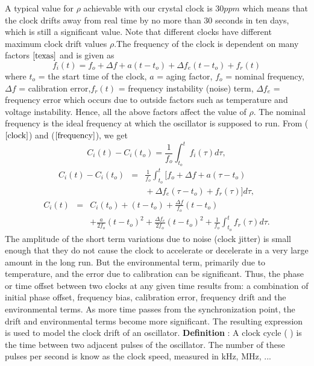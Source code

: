 \documentclass[a4paper,10pt]{report}
\begin{document}
\newline
A typical value for $\rho$ achievable with our crystal clock is $30ppm$ which means that the clock drifts away from real time by no more than 30 seconds in ten days, which is still a significant value. Note that different clocks have different maximum clock drift values
$\rho$.\newline The frequency of the clock is dependent on many factors $\cite{texas}$ and is given as
\begin{equation}
f_i(t) = f_o + \Delta f + a(t-t_o) + \Delta f_e(t-t_o) + f_r(t)
\label{frequency}
\end{equation}
where \newline $t_o$ = the start time of the clock, \newline $a$ = aging factor,  \newline $f_o$ = nominal frequency, \newline $\Delta
f$ = calibration error,\newline $f_r(t)$ = frequency instability (noise) term, \newline $\Delta f_e$ = frequency error which occurs
due to outside factors such as temperature and voltage instability. \newline Hence, all the above factors affect the value of $\rho$.
The nominal frequency is the ideal frequency at which the oscillator is supposed to run. From ($\ref{clock}$) and ($\ref{frequency}$), we get
\begin{equation}
C_i(t) - C_i(t_o) = \frac{1}{f_o} \int^{t}_{t_o}f_i(\tau)d\tau ,
\end{equation}
\begin{eqnarray*}
C_i(t) - C_i(t_o) & = & \frac{1}{f_o} \int^{t}_{t_o}{[f_o + \Delta f + a(\tau-t_o)  } \\
 &  & {} + \Delta f_e(\tau-t_o) + f_r(\tau)]d\tau ,
\label{fasika}
\end{eqnarray*}
\begin{eqnarray*}
C_i(t) & = & C_i(t_o) + (t-t_o) +\frac{\Delta f}{f_o}(t-t_o) \\
& & + \frac{a}{2f_o}(t-t_o)^2 + \frac{\Delta f_e}{2f_o}(t-t_o)^2 +
\frac{1}{f_o}\int^{t}_{t_o}{f_r(\tau)d\tau} .
\end{eqnarray*}
The amplitude of the short term variations due to noise (clock jitter) is small enough that they do not cause the clock to accelerate or decelerate in a very large amount in the long run. But the environmental term, primarily due to temperature, and the error due to calibration can be significant. Thus, the phase or time offset between two clocks at any given time results from: a combination of initial phase offset, frequency bias, calibration error, frequency drift and the environmental terms. As more time passes from the synchronization point, the drift and environmental terms become more significant. The resulting expression is used to model the clock drift of an oscillator.\newline
\textbf{Definition} : A clock cycle ( ) is the time between two adjacent pulses of the oscillator. The number of these pulses per second is know as the clock speed, measured in kHz, MHz, ...
\end{document}
